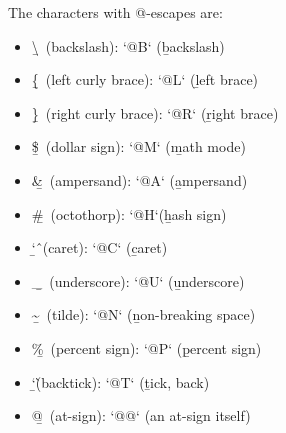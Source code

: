 The characters with @-escapes are:
\begin{itemize}
    \item \b{\textbackslash\ (backslash)}: \tex`@B` (\b{b}ackslash)
    \item \b{\{\ (left curly brace)}: \tex`@L` (\b{l}eft brace)
    \item \b{\}\ (right curly brace)}: \tex`@R` (\b{r}ight brace)
    \item \b{\$\ (dollar sign)}: \tex`@M` (\b{m}ath mode)
    \item \b{\&\ (ampersand)}: \tex`@A` (\b{a}mpersand)
    \item \b{\#\ (octothorp)}: \tex`@H`(\b{h}ash sign)
    \item \b{\char`\^\ (caret)}: \tex`@C` (\b{c}aret)
    \item \b{\_\ (underscore)}: \tex`@U` (\b{u}nderscore)
    \item \b{\textasciitilde\ (tilde)}: \tex`@N` (\b{n}on-breaking space)
    \item \b{\%\ (percent sign)}: \tex`@P` (\b{p}ercent sign) 
    \item \b{\char`\` (backtick)}: \tex`@T` (\b{t}ick, back)
    \item \b{@\ (at-sign)}: \tex`@@` (an at-sign itself)
\end{itemize}
